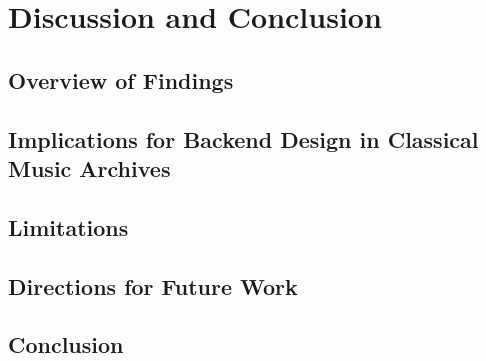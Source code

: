 \chapter{Discussion and Conclusion}

\section{Overview of Findings}

\section{Implications for Backend Design in Classical Music Archives}

\section{Limitations}


\section{Directions for Future Work}



\section{Conclusion}

